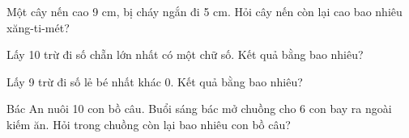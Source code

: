 \begin{ex} %
Một cây nến cao 9 cm, bị cháy ngắn đi 5 cm. Hỏi cây nến còn lại cao bao nhiêu xăng-ti-mét?
\end{ex}

\begin{ex} %
Lấy 10 trừ đi số chẵn lớn nhất có một chữ số. Kết quả bằng bao nhiêu?
\end{ex}

\begin{ex} %
Lấy 9 trừ đi số lẻ bé nhất khác 0. Kết quả bằng bao nhiêu?
\end{ex}

\begin{ex} %
Bác An nuôi 10 con bồ câu. Buổi sáng bác mở chuồng cho 6 con bay ra ngoài kiếm ăn. Hỏi trong chuồng còn lại bao nhiêu con bồ câu?
\end{ex}
